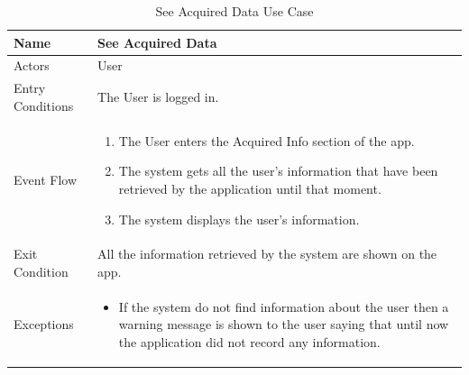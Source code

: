 \begin{enumerate}
\FloatBarrier
\begin{table}[h]
\begin{tabular}{|p{3.4cm}|p{}|}
\hline
Name             & See Acquired Data \\ \hline
Actors           & User  \\ \hline
Entry Conditions & The User is logged in. \\ \hline
Event Flow       & \begin{enumerate}
            \item The User enters the Acquired Info section of the app.
            \item The system gets all the user's information that have been retrieved by the application until that moment.
            \item The system displays the user's information.
\end{enumerate}\\ \hline
Exit Condition   & All the information retrieved by the system are shown on the app.\\ \hline
Exceptions       & \begin{itemize}
\item If the system do not find information about the user then a warning message is shown to the user saying that until now the application did not record any information.
\end{itemize}  \\ \hline
\end{tabular}
\caption{See Acquired Data Use Case}
\end{table}
\FloatBarrier


\end{enumerate}
